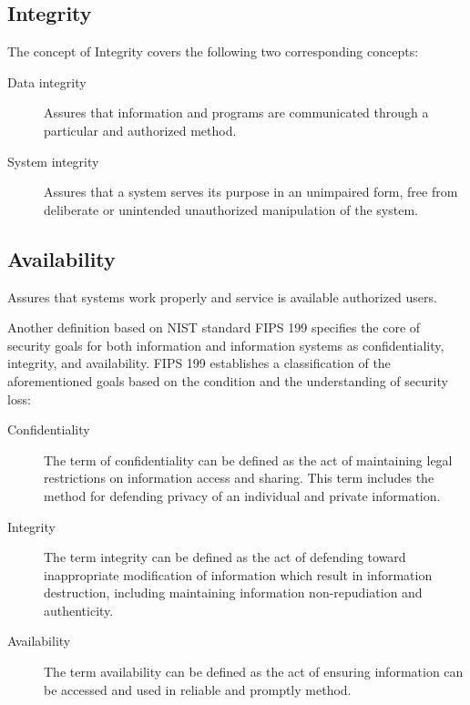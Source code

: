 \documentclass[../index.tex]{subfiles}
\begin{document}
\subsection{Integrity}

The concept of Integrity covers the following two corresponding concepts:

\begin{description}

	\item[Data integrity] Assures that information and programs are communicated through a particular
		and authorized method.

	\item[System integrity] Assures that a system serves its purpose in an unimpaired form, free from
		deliberate or unintended unauthorized manipulation of the system.

\end{description}

\subsection{Availability}

Assures that systems work properly and service is available authorized users.

Another definition based on NIST standard FIPS 199 specifies the core of security goals for both
information and information systems as confidentiality, integrity, and availability. FIPS 199
establishes a classification of the aforementioned goals based on the condition and the
understanding of security loss:

\begin{description}

	\item[Confidentiality] The term of confidentiality can be defined as the act of maintaining legal
		restrictions on information access and sharing. This term includes the method for defending
		privacy of an individual and private information.

	\item[Integrity] The term integrity can be defined as the act of defending toward inappropriate
		modification of information which result in information destruction, including maintaining
		information non-repudiation and authenticity.

	\item[Availability] The term availability can be defined as the act of ensuring information can be
		accessed and used in reliable and promptly method.

\end{description}
\end{document}
